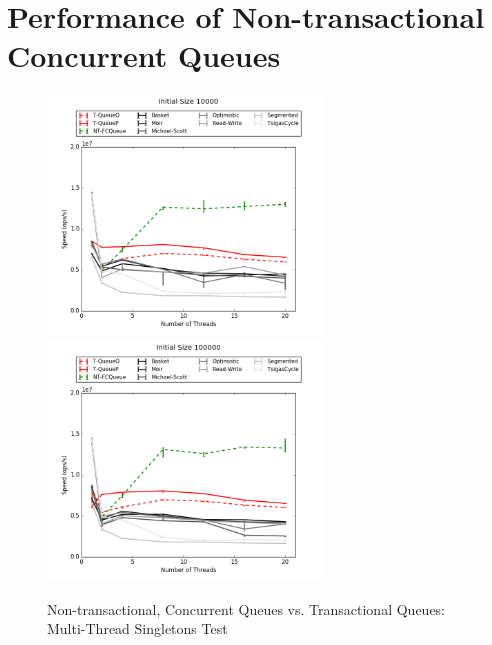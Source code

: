 \section{Performance of Non-transactional Concurrent Queues}
\begin{figure}[H]
    \centering
    \includegraphics[width=0.65\textwidth]{concurrent/allQ:RandSingleOps10000.png}
    \includegraphics[width=0.65\textwidth]{concurrent/allQ:RandSingleOps100000.png}
    \caption{Non-transactional, Concurrent Queues vs. Transactional Queues: Multi-Thread Singletons Test}
\end{figure}
